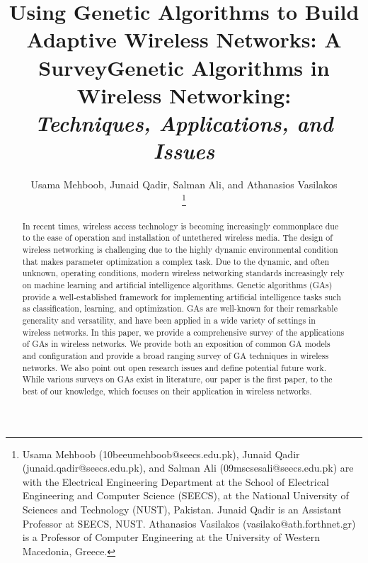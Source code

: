 \documentclass[journal]{IEEEtran}
\begin{document}
\title{Using Genetic Algorithms to Build Adaptive Wireless Networks: A Survey}
\title{Genetic Algorithms in Wireless Networking: \\
\textit{Techniques, Applications, and Issues}}


\author{Usama Mehboob, Junaid Qadir, Salman Ali, and Athanasios Vasilakos

\thanks{Usama Mehboob (10beeumehboob@seecs.edu.pk), Junaid Qadir (junaid.qadir@seecs.edu.pk), and Salman Ali (09mscsesali@seecs.edu.pk) are with the Electrical Engineering Department at the School of Electrical Engineering and Computer Science (SEECS), at the National University of Sciences and Technology (NUST), Pakistan. Junaid Qadir is an Assistant Professor at SEECS, NUST. Athanasios Vasilakos (vasilako@ath.forthnet.gr) is a Professor of Computer Engineering at the University of Western Macedonia, Greece.}}

\maketitle

\begin{abstract}

In recent times, wireless access technology is becoming increasingly commonplace due to the ease of operation and installation of untethered wireless media. The design of wireless networking is challenging due to the highly dynamic environmental condition that makes parameter optimization a complex task. Due to the dynamic, and often unknown, operating conditions, modern wireless networking standards increasingly rely on machine learning and artificial intelligence algorithms. Genetic algorithms (GAs) provide a well-established framework for implementing artificial intelligence tasks such as classification, learning, and optimization. GAs are well-known for their remarkable generality and versatility, and have been applied in a wide variety of settings in wireless networks. In this paper, we provide a comprehensive survey of the applications of GAs in wireless networks. We provide both an exposition of common GA models and configuration and provide a broad ranging survey of GA techniques in wireless networks. We also point out open research issues and define potential future work. While various surveys on GAs exist in literature, our paper is the first paper, to the best of our knowledge, which focuses on their application in wireless networks.
\end{abstract}
\end{document}
